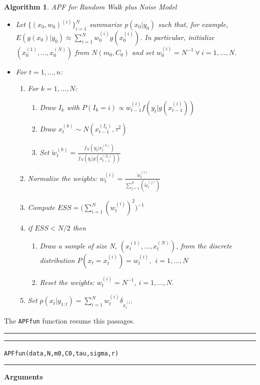 \documentclass[
]{book}
\theoremstyle{break}
\theoremstyle{nonumberplain}
\newtheorem{algorithm}{Algorithm}[section]
\begin{document}
\begin{algorithm} APF for Random Walk plus Noise Model
\begin{itemize}
\item Let $\{(x_{0},w_{0})^{(i)}\}_{i=1}^{N}$ summarize $p(x_{0}|y_{0})$ such that, for example, $E(g(x_{0})|y_{0}) \approx \sum_{i=1}^{N}w_{0}^{(i)}g(x_{0}^{(i)})$. In particular, initialize $(x_{0}^{(1)},...,x_{0}^{(N)})$ from $N(m_{0},C_{0})$ and set $w_{0}^{(i)}=N^{-1} \ \forall \ i=1,...,N$.
\item For $t=1,...,n$:
\begin{enumerate}
\item For $k=1,...,N$:
\begin{enumerate}
\item Draw $I_{k}$ with $P(I_{k}=i) \propto w_{t-1}^{(i)}f(y_{t}|g(x_{t-1}^{(i)})) $
\item Draw $x_{t}^{(k)} \sim N(x_{t-1}^{(I_{k})},\tau^2)$
\item Set  $\tilde{w}_{t}^{(k)} = \frac{f_{N}(y_{t}|x_{t}^{(k)})}{f_{N}(y_{t}|g(x_{t-1}^{(I_{k})}))}$
\end{enumerate}
\item Normalize the weights: $w_{t}^{(i)}=\frac{\tilde{w}_{t}^{(i)}}{\sum_{j=1}^{N}(\tilde{w}_{t}^{(j)})}$
\item Compute $ESS=\Bigg(\sum_{i=1}^{N}(w_{t}^{(i)})^{2}\Bigg)^{-1}$
\item if $ESS<N/2$ then
\begin{enumerate}
\item Draw a sample of size N, $(x_{t}^{(1)},...,x_{t}^{(N)})$, from the discrete distribution $P(x_{t}=x_{t}^{(i)})=w_{t}^{(i)},\ \ i=1,...,N$
\item Reset the weights: $w_{t}^{(i)}=N^{-1}$, $i=1,...,N$.
\end{enumerate}
\item Set $p(x_{t}|y_{1:t})=\sum_{i=1}^{N}w_{t}^{(i)}\delta_{x_{t}^{(i)}}$
\end{enumerate}
\end{itemize}
\end{algorithm}

The \texttt{APFfun} function resume this passages.\\

\hrule
\hrule

\texttt{APFfun(data,N,m0,C0,tau,sigma,r)}\\

\hrule

\textbf{Arguments}
\end{document}
